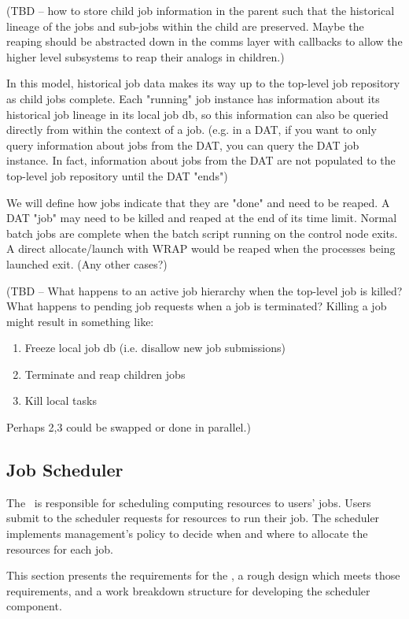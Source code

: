 (TBD -- how to store child job information in the parent such that the
historical lineage of the jobs and sub-jobs within the child are
preserved.  Maybe the reaping should be abstracted down in the comms
layer with callbacks to allow the higher level subsystems to reap
their analogs in children.)

In this model, historical job data makes its way up to the top-level
job repository as child jobs complete. Each "running" job instance has
information about its historical job lineage in its local job db, so
this information can also be queried directly from within the context
of a job. (e.g. in a DAT, if you want to only query information about
jobs from the DAT, you can query the DAT job instance. In fact,
information about jobs from the DAT are not populated to the top-level
job repository until the DAT "ends")

We will define how jobs indicate that they are "done" and need to be
reaped. A DAT "job" may need to be killed and reaped at the end of its
time limit. Normal batch jobs are complete when the batch script
running on the control node exits. A direct allocate/launch with WRAP
would be reaped when the processes being launched exit. (Any other
cases?)

(TBD -- What happens to an active job hierarchy when the top-level job
is killed?  What happens to pending job requests when a job is
terminated?  Killing a job might result in something like:

\begin{enumerate}
\item Freeze local job db (i.e. disallow new job submissions)
\item Terminate and reap children jobs
\item Kill local tasks
\end{enumerate}

Perhaps 2,3 could be swapped or done in parallel.)

\subsection{Job Scheduler}

The \ngjs\ is responsible for scheduling computing resources to users'
jobs.  Users submit to the scheduler requests for resources to run
their job.  The scheduler implements management's policy to decide
when and where to allocate the resources for each job.

This section presents the requirements for the \ngjs, a rough design
which meets those requirements, and a work breakdown structure for
developing the scheduler component.

